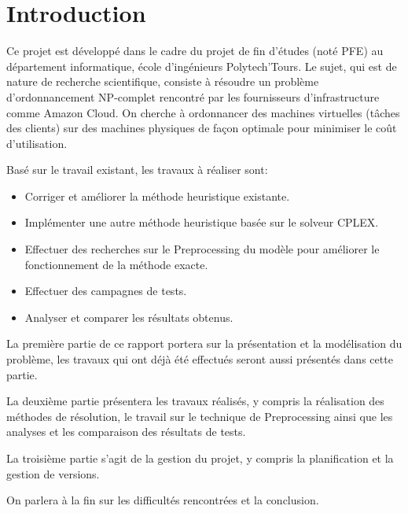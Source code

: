 \chapter{Introduction}
Ce projet est développé dans le cadre du projet de fin d'études (noté PFE) au département informatique, école d'ingénieurs Polytech'Tours. Le sujet, qui est de nature de recherche scientifique, consiste à résoudre un problème d'ordonnancement NP-complet rencontré par les fournisseurs d'infrastructure comme Amazon Cloud. On cherche à ordonnancer des machines virtuelles (tâches des clients) sur des machines physiques de façon optimale pour minimiser le coût d'utilisation.


Basé sur le travail existant, les travaux à réaliser sont:
\bigskip
\begin{itemize}
	\item Corriger et améliorer la méthode heuristique existante.
	\item Implémenter une autre méthode heuristique basée sur le solveur CPLEX.
	\item Effectuer des recherches sur le Preprocessing du modèle pour améliorer le fonctionnement de la méthode exacte.
	\item Effectuer des campagnes de tests.
	\item Analyser et comparer les résultats obtenus.
\end{itemize}
\bigskip


La première partie de ce rapport portera sur la présentation et la modélisation du problème, les travaux qui ont déjà été effectués seront aussi présentés dans cette partie.


La deuxième partie présentera les travaux réalisés, y compris la réalisation des méthodes de résolution, le travail sur le technique de Preprocessing ainsi que les analyses et les comparaison des résultats de tests. 


La troisième partie s'agit de la gestion du projet, y compris la planification et la gestion de versions.

On parlera à la fin sur les difficultés rencontrées et la conclusion.